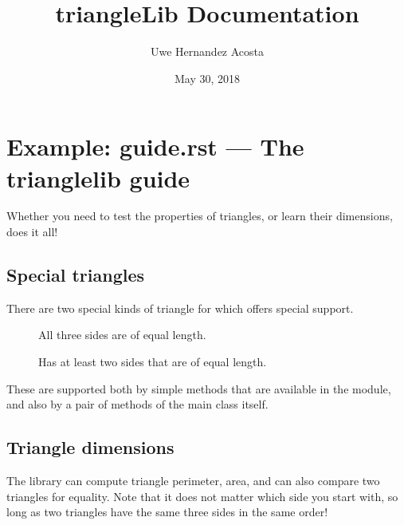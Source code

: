 \documentclass[letterpaper,10pt,english]{sphinxmanual}
\title{triangleLib Documentation}
\date{May 30, 2018}
\author{Uwe Hernandez Acosta}
\begin{document}
\maketitle
\sphinxtableofcontents
{}\label{\detokenize{index::doc}}



\chapter{Example: guide.rst — The trianglelib guide}
\label{\detokenize{guide:welcome-to-trianglelib-s-documentation}}\label{\detokenize{guide::doc}}\label{\detokenize{guide:example-guide-rst-the-trianglelib-guide}}
Whether you need to test the properties of triangles,
or learn their dimensions,  does it all!


\section{Special triangles}
\label{\detokenize{guide:special-triangles}}
There are two special kinds of triangle
for which  offers special support.
\begin{description}
\item[{}] \leavevmode
All three sides are of equal length.

\item[{}] \leavevmode
Has at least two sides that are of equal length.

\end{description}

These are supported both by simple methods
that are available in the {\hyperref[\detokenize{api:module-trianglelib.utils}]{}} module,
and also by a pair of methods of the main
{\hyperref[\detokenize{api:trianglelib.shape.Triangle}]{}} class itself.


\section{Triangle dimensions}
\label{\detokenize{guide:triangle-dimensions}}\label{\detokenize{guide:id1}}
The library can compute triangle perimeter, area,
and can also compare two triangles for equality.
Note that it does not matter which side you start with,
so long as two triangles have the same three sides in the same order!
\end{document}
